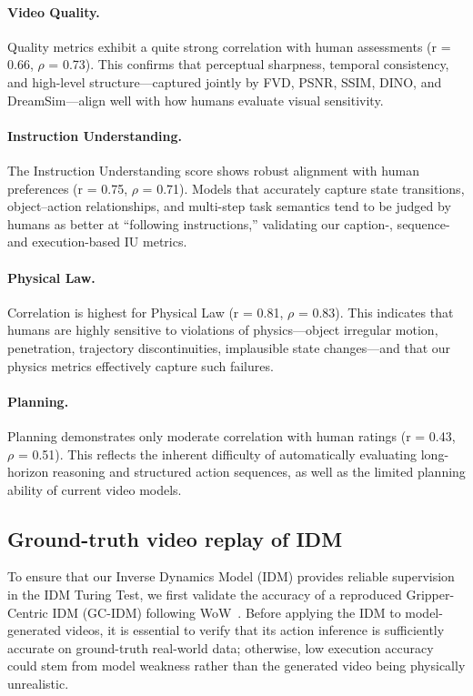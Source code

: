 \paragraph{Video Quality.}
Quality metrics exhibit a quite strong correlation with human assessments (r = 0.66, $\rho$ = 0.73). This confirms that perceptual sharpness, temporal consistency, and high-level structure—captured jointly by FVD, PSNR, SSIM, DINO, and DreamSim—align well with how humans evaluate visual sensitivity.

\paragraph{Instruction Understanding.}
The Instruction Understanding score shows robust alignment with human preferences (r = 0.75, $\rho$ = 0.71). Models that accurately capture state transitions, object–action relationships, and multi-step task semantics tend to be judged by humans as better at “following instructions,” validating our caption-, sequence- and execution-based IU metrics.

\paragraph{Physical Law.}
Correlation is highest for Physical Law (r = 0.81, $\rho$ = 0.83). This indicates that humans are highly sensitive to violations of physics—object irregular motion, penetration, trajectory discontinuities, implausible state changes—and that our physics metrics effectively capture such failures. 

\paragraph{Planning.}
Planning demonstrates only moderate correlation with human ratings (r = 0.43, $\rho$ = 0.51). This reflects the inherent difficulty of automatically evaluating long-horizon reasoning and structured action sequences, as well as the limited planning ability of current video models. 

\subsection{Ground-truth video replay of IDM}
\label{ssec:IDM}
To ensure that our Inverse Dynamics Model (IDM) provides reliable supervision in the IDM Turing Test, we first validate the accuracy of a reproduced Gripper-Centric IDM (GC-IDM) following WoW~\cite{chi2025wow}. Before applying the IDM to model-generated videos, it is essential to verify that its action inference is sufficiently accurate on ground-truth real-world data; otherwise, low execution accuracy could stem from model weakness rather than the generated video being physically unrealistic.

